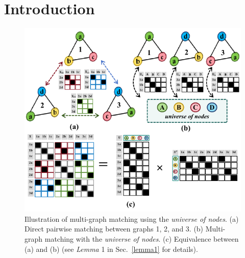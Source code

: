 \section{Introduction}
\label{sec:intro}

\begin{figure}[!t]
    \centering
    \includegraphics[width=0.98\linewidth]{Figures/motivation_.pdf}
    \caption{Illustration of multi-graph matching using the \textit{universe of nodes}.
 (a) Direct pairwise matching between graphs 1, 2, and 3. (b) Multi-graph matching with the \textit{universe of nodes}. (c) Equivalence between (a) and (b) (see \textit{Lemma} 1 in Sec.~\ref{lemma1} for details).}
    \vspace{-10pt}
    \label{fig:moti}
\end{figure}

